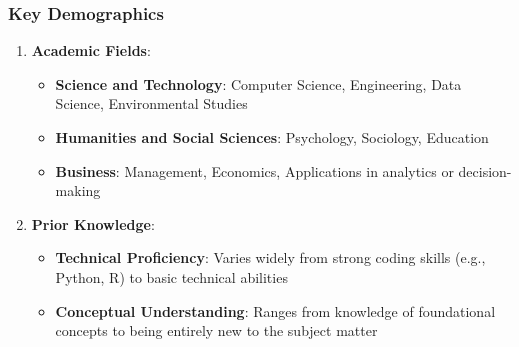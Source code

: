 \documentclass[aspectratio=169]{beamer}
\begin{document}
\begin{frame}[fragile]
    \frametitle{Key Demographics}
    
    \begin{enumerate}
        \item \textbf{Academic Fields}:
        \begin{itemize}
            \item \textbf{Science and Technology}: Computer Science, Engineering, Data Science, Environmental Studies
            \item \textbf{Humanities and Social Sciences}: Psychology, Sociology, Education
            \item \textbf{Business}: Management, Economics, Applications in analytics or decision-making
        \end{itemize}
        
        \item \textbf{Prior Knowledge}:
        \begin{itemize}
            \item \textbf{Technical Proficiency}: Varies widely from strong coding skills (e.g., Python, R) to basic technical abilities
            \item \textbf{Conceptual Understanding}: Ranges from knowledge of foundational concepts to being entirely new to the subject matter
        \end{itemize}
    \end{enumerate}
\end{frame}
\end{document}
